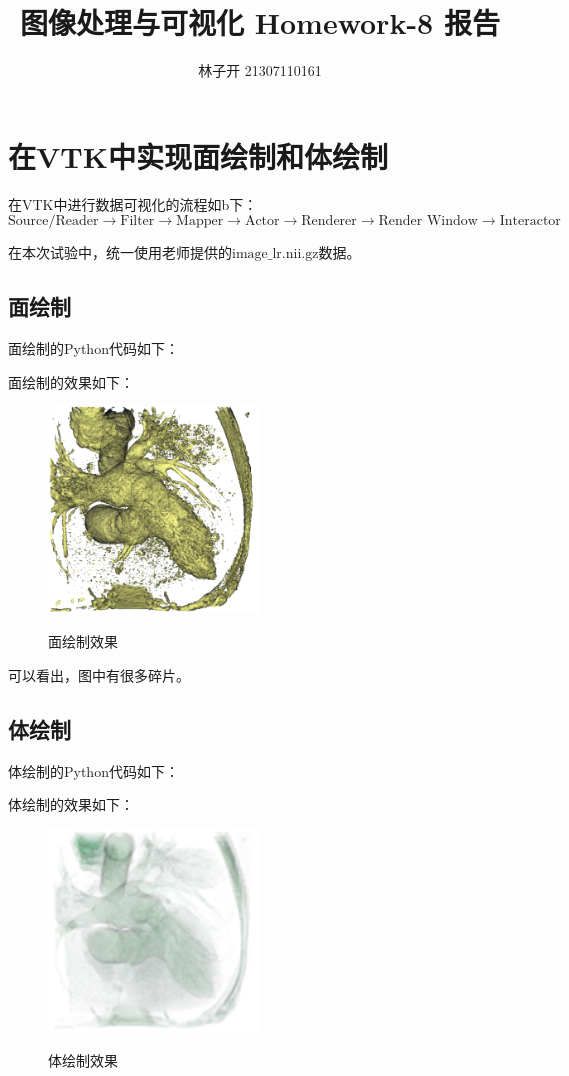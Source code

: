 \documentclass{article}
\title{图像处理与可视化 Homework-8 报告}
\author{林子开 21307110161}
\begin{document}
	\maketitle
	\tableofcontents

\section{在VTK中实现面绘制和体绘制}
在VTK中进行数据可视化的流程如b下：
\[
\text{Source/Reader} \rightarrow \text{Filter} \rightarrow \text{Mapper} \rightarrow \text{Actor}
\rightarrow \text{Renderer} \rightarrow \text{Render Window} \rightarrow \text{Interactor}    
\]

在本次试验中，统一使用老师提供的$\text{image\_lr.nii.gz}$数据。

\subsection{面绘制}
面绘制的Python代码如下：
 

面绘制的效果如下：
\begin{figure}[H]
	\centering
	{\includegraphics[width=0.5\textwidth]{image//面绘制.png}} 
	\caption{面绘制效果} 
\end{figure}
可以看出，图中有很多碎片。

\subsection{体绘制}
体绘制的Python代码如下：
 
体绘制的效果如下：
\begin{figure}[H]
	\centering
	{\includegraphics[width=0.5\textwidth]{image//体绘制.png}} 
	\caption{体绘制效果} 
\end{figure}
\end{document}

